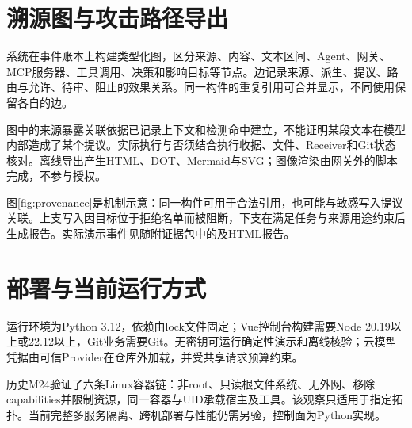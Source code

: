 \section{溯源图与攻击路径导出}
系统在事件账本上构建类型化图，区分来源、内容、文本区间、Agent、网关、MCP服务器、工具调用、决策和影响目标等节点。边记录来源、派生、提议、路由与允许、待审、阻止的效果关系。同一构件的重复引用可合并显示，不同使用保留各自的边。

图中的来源暴露关联依据已记录上下文和检测命中建立，不能证明某段文本在模型内部造成了某个提议。实际执行与否须结合执行收据、文件、Receiver和Git状态核对。离线导出产生HTML、DOT、Mermaid与SVG；图像渲染由网关外的脚本完成，不参与授权。



图\ref{fig:provenance}是机制示意：同一构件可用于合法引用，也可能与敏感写入提议关联。上支写入因目标位于拒绝名单而被阻断，下支在满足任务与来源用途约束后生成报告。实际演示事件见随附证据包中的及HTML报告。

\section{部署与当前运行方式}
运行环境为Python 3.12，依赖由lock文件固定；Vue控制台构建需要Node 20.19以上或22.12以上，Git业务需要Git。无密钥可运行确定性演示和离线核验；云模型凭据由可信Provider在仓库外加载，并受共享请求预算约束。

历史M24验证了六条Linux容器链：非root、只读根文件系统、无外网、移除capabilities并限制资源，同一容器与UID承载宿主及工具。该观察只适用于指定拓扑。当前完整多服务隔离、跨机部署与性能仍需另验，控制面为Python实现。
